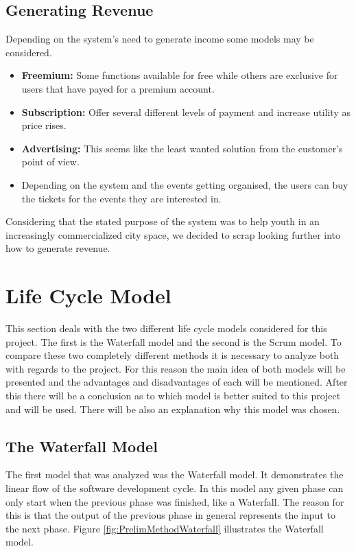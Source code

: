 \subsection{Generating Revenue}
\label{subsec:PrelimMarketRevenue}
Depending on the system's need to generate income some models may be considered.
\begin{itemize}
  \item \textbf{Freemium:} Some functions available for free while others are exclusive for users that have payed for a premium account.
  \item \textbf{Subscription:} Offer several different levels of payment and increase utility as price rises.
  \item \textbf{Advertising:} This seems like the least wanted solution from the customer's point of view.
  \item Depending on the system and the events getting organised, the users can buy the tickets for the events they are interested in.
\end{itemize}

Considering that the stated purpose of the system was to help youth in an increasingly commercialized city space, we decided to scrap looking further into how to generate revenue.

\section{Life Cycle Model}
\label{sec:PrelimMethod}

This section deals with the two different life cycle models considered for this project. The first is the Waterfall model and the second is the Scrum model. To compare these two completely different methods it is necessary to analyze both with regards to the project. For this reason the main idea of both models will be presented and the advantages and disadvantages of each will be mentioned. After this there will be a conclusion as to which model is better suited to this project and will be used. There will be also an explanation why this model was chosen.

\subsection{The Waterfall Model}
\label{sec:PrelimMethodWaterfall}
The first model that was analyzed was the Waterfall model. It demonstrates the linear flow of the software development cycle. In this model any given phase can only start when the previous phase was finished, like a Waterfall. The reason for this is that the output of the previous phase in general represents the input to the next phase. Figure \ref{fig:PrelimMethodWaterfall} illustrates the Waterfall model.

